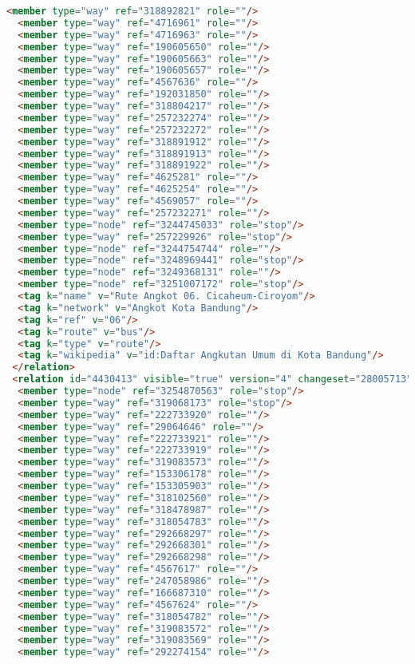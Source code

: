 \begin{lstlisting}[language=HTML,basicstyle=\tiny,caption=test.xml]
  <member type="way" ref="318892821" role=""/>
  <member type="way" ref="4716961" role=""/>
  <member type="way" ref="4716963" role=""/>
  <member type="way" ref="190605650" role=""/>
  <member type="way" ref="190605663" role=""/>
  <member type="way" ref="190605657" role=""/>
  <member type="way" ref="4567636" role=""/>
  <member type="way" ref="192031850" role=""/>
  <member type="way" ref="318804217" role=""/>
  <member type="way" ref="257232274" role=""/>
  <member type="way" ref="257232272" role=""/>
  <member type="way" ref="318891912" role=""/>
  <member type="way" ref="318891913" role=""/>
  <member type="way" ref="318891922" role=""/>
  <member type="way" ref="4625281" role=""/>
  <member type="way" ref="4625254" role=""/>
  <member type="way" ref="4569057" role=""/>
  <member type="way" ref="257232271" role=""/>
  <member type="node" ref="3244745033" role="stop"/>
  <member type="way" ref="257229926" role="stop"/>
  <member type="node" ref="3244754744" role=""/>
  <member type="node" ref="3248969441" role="stop"/>
  <member type="node" ref="3249368131" role=""/>
  <member type="node" ref="3251007172" role="stop"/>
  <tag k="name" v="Rute Angkot 06. Cicaheum-Ciroyom"/>
  <tag k="network" v="Angkot Kota Bandung"/>
  <tag k="ref" v="06"/>
  <tag k="route" v="bus"/>
  <tag k="type" v="route"/>
  <tag k="wikipedia" v="id:Daftar Angkutan Umum di Kota Bandung"/>
 </relation>
 <relation id="4430413" visible="true" version="4" changeset="28005713" timestamp="2015-01-08T20:32:48Z" user="isonpurba" uid="2552445">
  <member type="node" ref="3254870563" role="stop"/>
  <member type="way" ref="319068173" role="stop"/>
  <member type="way" ref="222733920" role=""/>
  <member type="way" ref="29064646" role=""/>
  <member type="way" ref="222733921" role=""/>
  <member type="way" ref="222733919" role=""/>
  <member type="way" ref="319083573" role=""/>
  <member type="way" ref="153306178" role=""/>
  <member type="way" ref="153305903" role=""/>
  <member type="way" ref="318102560" role=""/>
  <member type="way" ref="318478987" role=""/>
  <member type="way" ref="318054783" role=""/>
  <member type="way" ref="292668297" role=""/>
  <member type="way" ref="292668301" role=""/>
  <member type="way" ref="292668298" role=""/>
  <member type="way" ref="4567617" role=""/>
  <member type="way" ref="247058986" role=""/>
  <member type="way" ref="166687310" role=""/>
  <member type="way" ref="4567624" role=""/>
  <member type="way" ref="318054782" role=""/>
  <member type="way" ref="319083572" role=""/>
  <member type="way" ref="319083569" role=""/>
  <member type="way" ref="292274154" role=""/>

\end{lstlisting}
